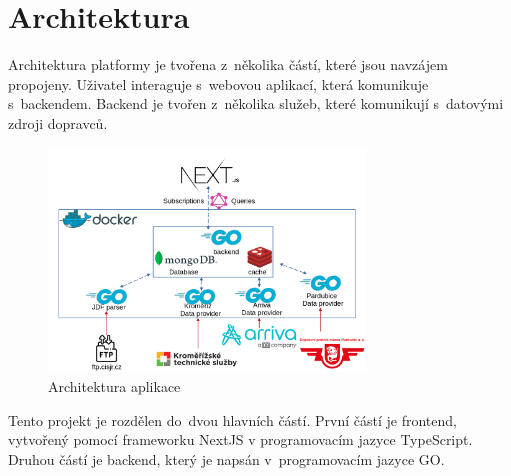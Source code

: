 \section{Architektura}
Architektura platformy je tvořena z~několika částí, které jsou navzájem propojeny. Uživatel interaguje s~webovou aplikací, která komunikuje s~backendem. Backend je tvořen z~několika služeb, které komunikují s~datovými zdroji dopravců.
\begin{figure}[H]
    \centering
    \includegraphics[width=0.75\textwidth]{images/architekturaV5.png}
    \caption{Architektura aplikace}
    \label{architektura}
\end{figure}
\newpage
Tento projekt je rozdělen do~dvou hlavních částí. První částí je frontend, vytvořený pomocí frameworku NextJS v programovacím jazyce TypeScript.
Druhou částí je backend, který je napsán v~programovacím jazyce GO.